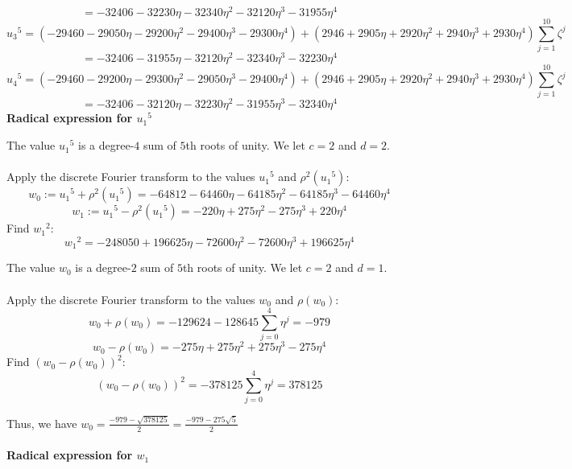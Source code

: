 \documentclass{article}
\begin{document}
\begin{adjustwidth}{1cm}{}
            $$ = -32406 - 32230 \eta - 32340 \eta^2 - 32120 \eta^3 - 31955 \eta^4 $$
            $$ {u_3}^5 = (-29460 - 29050 \eta - 29200 \eta^2 - 29400 \eta^3 - 29300 \eta^4) + (2946 + 2905 \eta + 2920 \eta^2 + 2940 \eta^3 + 2930 \eta^4) \sum_{j = 1}^{10} \zeta^j $$
            $$ = -32406 - 31955 \eta - 32120 \eta^2 - 32340 \eta^3 - 32230 \eta^4 $$
            $$ {u_4}^5 = (-29460 - 29200 \eta - 29300 \eta^2 - 29050 \eta^3 - 29400 \eta^4) + (2946 + 2905 \eta + 2920 \eta^2 + 2940 \eta^3 + 2930 \eta^4) \sum_{j = 1}^{10} \zeta^j $$
            $$ = -32406 - 32120 \eta - 32230 \eta^2 - 31955 \eta^3 - 32340 \eta^4 $$
            \textbf{Radical expression for $ {u_1}^5 $}\\
            \begin{adjustwidth}{1cm}{}
                The value $ {u_1}^5 $ is a degree-$ 4 $ sum of $ 5 $th roots of unity. We let $ c = 2 $ and $ d = 2 $.\\
                \\
                Apply the discrete Fourier transform to the values $ {u_1}^5 $ and $ \rho^2({u_1}^5) $:
                $$ w_0 := {u_1}^5 + \rho^2({u_1}^5) = -64812 - 64460 \eta - 64185 \eta^2 - 64185 \eta^3 - 64460 \eta^4 $$
                $$ w_1 := {u_1}^5 - \rho^2({u_1}^5) = -220 \eta + 275 \eta^2 - 275 \eta^3 + 220 \eta^4 $$
                Find $ {w_1}^2 $:
                $$ {w_1}^2 = -248050 + 196625 \eta - 72600 \eta^2 - 72600 \eta^3 + 196625 \eta^4 $$
                \begin{adjustwidth}{1cm}{}
                    The value $ w_0 $ is a degree-$ 2 $ sum of $ 5 $th roots of unity. We let $ c = 2 $ and $ d = 1 $.\\
                    \\
                    Apply the discrete Fourier transform to the values $ w_0 $ and $ \rho(w_0) $:
                    $$ w_0 + \rho(w_0) = -129624 - 128645\sum_{j = 0}^4 \eta^j = -979 $$
                    $$ w_0 - \rho(w_0) = -275 \eta + 275 \eta^2 + 275 \eta^3 - 275 \eta^4 $$
                    Find $ (w_0 - \rho(w_0))^2 $:
                    $$ (w_0 - \rho(w_0))^2 = -378125\sum_{j = 0}^4 \eta^j = 378125 $$
                \end{adjustwidth}
                Thus, we have $ w_0 = \frac{-979 - \sqrt{378125}}{2} = \frac{-979-275 \sqrt{5}}{2} $\\
                \\
                \textbf{Radical expression for $ w_1 $}\\
                \begin{adjustwidth}{1cm}{}

\end{adjustwidth}
\end{adjustwidth}
\end{adjustwidth}
\end{document}
